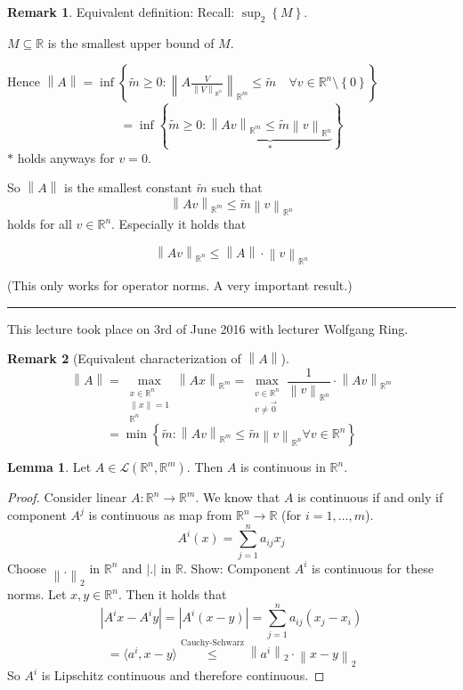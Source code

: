 \documentclass[a4paper,landscape,twocolumn]{article}
\theoremstyle{definition}
\newtheorem{rem}{Remark}
\newtheorem{lemma}{Lemma}
\newcommand\set[1]{\left\{#1\right\}}
\newcommand\abs[1]{\left|#1\right|}
\newcommand\meta[3]{\hrule{} This #1 took place on #2 with lecturer #3.\par}
\newcommand\norm[1]{\left\|#1\right\|}
\begin{document}
\begin{rem}
  Equivalent definition: Recall: $\sup_2\set{M}$.

  $M \subseteq \mathbb R$ is the smallest upper bound of $M$.

  Hence $\norm{A} = \inf\set{\tilde{m} \geq 0: \norm{A \frac{V}{\norm{V}_{\mathbb R^n}}}_{\mathbb R^m} \leq \tilde{m} \quad \forall v \in \mathbb R^n \setminus \set{0}}$
  \[ = \inf\set{\tilde{m} \geq 0: \underbrace{\norm{Av}_{\mathbb R^m} \leq \tilde{m} \norm{v}_{\mathbb R^n}}_{*}} \]
  $*$ holds anyways for $v = 0$.

  So $\norm{A}$ is the smallest constant $\tilde{m}$ such that
  \[ \norm{A v}_{\mathbb R^m} \leq \tilde{m} \norm{v}_{\mathbb R^n} \]
  holds for all $v \in \mathbb R^n$. Especially it holds that
  \begin{mdframed}
    \[ \norm{Av}_{\mathbb R^n} \leq \norm{A} \cdot \norm{v}_{\mathbb R^n} \]
    \end{mdframed}
  (This only works for operator norms. A very important result.)
\end{rem}

\meta{lecture}{3rd of June 2016}{Wolfgang Ring}

\begin{rem}[Equivalent characterization of $\norm{A}$]
  \[ \norm{A} = \max_{\substack{x \in \mathbb R^n \\ \norm{x} = 1 \\ \mathbb R^n}} \norm{Ax}_{\mathbb R^m} = \max_{\substack{v \in \mathbb R^n \\ v \neq \vec{0}}} \frac{1}{\norm{v}_{\mathbb R^n}} \cdot \norm{Av}_{\mathbb R^m} \]
  \[ = \min\set{\tilde{m}: \norm{Av}_{\mathbb R^m} \leq  \tilde{m} \norm{v}_{\mathbb R^n} \forall v \in \mathbb R^n} \]
\end{rem}

\begin{lemma}
  Let $A \in \mathcal{L}(\mathbb R^n, \mathbb R^m)$. Then $A$ is continuous in $\mathbb R^n$.
\end{lemma}
\begin{proof}
  Consider linear $A: \mathbb R^n \to \mathbb R^m$. We know that $A$ is continuous if and only if component $A^j$ is continuous as map from $\mathbb R^n \to \mathbb R$ (for $i=1,\ldots,m$).
  \[ A^i(x) = \sum_{j=1}^n a_{ij} x_j \]
  Choose $\norm{.}_2$ in $\mathbb R^n$ and $\abs{.}$ in $\mathbb R$.
  Show: Component $A^i$ is continuous for these norms.
  Let $x,y \in \mathbb R^n$. Then it holds that
  \[ \abs{A^i x - A^i y} = \abs{A^i (x - y)} = \sum_{j=1}^n a_{ij} (x_j - x_i) \]
  \[ = \langle a^i, x - y\rangle \overset{\text{Cauchy-Schwarz}}{\leq} \norm{a^i}_2 \cdot \norm{x - y}_2  \]
  So $A^i$ is Lipschitz continuous and therefore continuous.
\end{proof}
\end{document}
